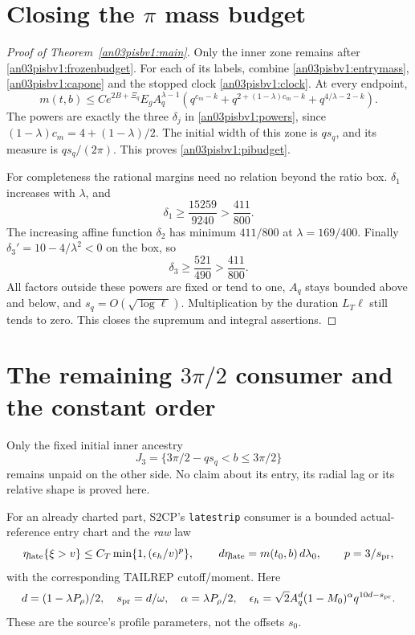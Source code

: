\documentclass[11pt]{article}
\numberwithin{equation}{section}
\theoremstyle{remark}\newtheorem{remark}[theorem]{Remark}
\newcommand{\dd}{\,d}
\begin{document}
\section{Closing the \texorpdfstring{$\pi$}{pi} mass budget}
\begin{proof}[Proof of Theorem~\ref{an03pisbv1:main}]
Only the inner zone remains after \eqref{an03pisbv1:frozenbudget}.
For each of its labels, combine
\eqref{an03pisbv1:entrymass},
\eqref{an03pisbv1:capone} and the stopped clock
\eqref{an03pisbv1:clock}. At every endpoint,
\[
 m(t,b)\le
 C e^{2B+\Xi_q}E_gA_q^{\lambda-1}
       \left(q^{c_m-k}
             +q^{2+(1-\lambda)c_m-k}
             +q^{4/\lambda-2-k}\right).
\]
The powers are exactly the three $\delta_j$ in
\eqref{an03pisbv1:powers}, since
$(1-\lambda)c_m=4+(1-\lambda)/2$.
The initial width of this zone is $qs_q$, and its measure is
$qs_q/(2\pi)$. This proves \eqref{an03pisbv1:pibudget}.

For completeness the rational margins need no relation beyond
the ratio box. $\delta_1$ increases with $\lambda$, and
\[
 \delta_1\ge\frac{15259}{9240}>\frac{411}{800}.
\]
The increasing affine function $\delta_2$ has minimum
$411/800$ at $\lambda=169/400$.
Finally $\delta_3'=10-4/\lambda^2<0$ on the box, so
\[
 \delta_3\ge\frac{521}{490}>\frac{411}{800}.
\]
All factors outside these powers are fixed or tend to one,
$A_q$ stays bounded above and below, and
$s_q=O(\sqrt{\log\ell})$. Multiplication by the duration
$L_T\ell$ still tends to zero. This closes the supremum and
integral assertions.
\end{proof}

\section{The remaining \texorpdfstring{$3\pi/2$}{3pi/2} consumer and the constant order}
Only the fixed initial inner ancestry
\[
 J_3=\{3\pi/2-qs_q<b\le3\pi/2\}
\]
remains unpaid on the other side. No claim about its entry, its
radial lag or its relative shape is proved here.

For an already charted part, S2CP's \texttt{latestrip} consumer is a
bounded actual-reference entry chart and the \emph{raw} law
\[
 \eta_{\rm late}\{\xi>v\}
     \le C_T\min\{1,(\epsilon_h/v)^p\},\qquad
 \dd\eta_{\rm late}=m(t_0,b)\dd\lambda_0,\qquad p=3/s_{\rm pr},
\]
with the corresponding TAILREP cutoff/moment. Here
\[
 d=(1-\lambda P_\rho)/2,\quad s_{\rm pr}=d/\omega,\quad
 \alpha=\lambda P_\rho/2,\quad
 \epsilon_h=\sqrt2 A_q^d(1-M_0)^\alpha q^{10d-s_{\rm pr}} .
\]
These are the source's profile parameters, not the offsets $s_0$.
\end{document}
